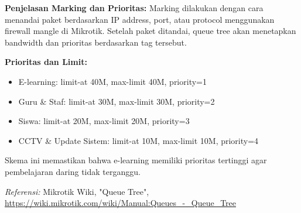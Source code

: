 \textbf{Penjelasan Marking dan Prioritas:}
Marking dilakukan dengan cara menandai paket berdasarkan IP address, port, atau protocol menggunakan firewall mangle di Mikrotik. Setelah paket ditandai, queue tree akan menetapkan bandwidth dan prioritas berdasarkan tag tersebut.

\textbf{Prioritas dan Limit:}
\begin{itemize}
  \item E-learning: limit-at 40M, max-limit 40M, priority=1
  \item Guru \& Staf: limit-at 30M, max-limit 30M, priority=2
  \item Siswa: limit-at 20M, max-limit 20M, priority=3
  \item CCTV \& Update Sistem: limit-at 10M, max-limit 10M, priority=4
\end{itemize}

Skema ini memastikan bahwa e-learning memiliki prioritas tertinggi agar pembelajaran daring tidak terganggu.

\textit{Referensi:}
Mikrotik Wiki, "Queue Tree", \url{https://wiki.mikrotik.com/wiki/Manual:Queues_-_Queue_Tree}

